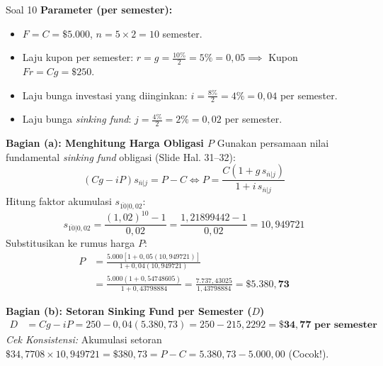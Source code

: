 \documentclass[11pt,a4paper]{article}
\begin{document}
\begin{solutionbox}{Soal 10}
\textbf{Parameter (per semester):}
\begin{itemize}[itemsep=1pt]
    \item $F = C = \$5.000$, $n = 5 \times 2 = 10$ semester.
    \item Laju kupon per semester: $r = g = \frac{10\%}{2} = 5\% = 0{,}05 \implies$ Kupon $Fr = Cg = \$250$.
    \item Laju bunga investasi yang diinginkan: $i = \frac{8\%}{2} = 4\% = 0{,}04$ per semester.
    \item Laju bunga \textit{sinking fund}: $j = \frac{4\%}{2} = 2\% = 0{,}02$ per semester.
\end{itemize}

\textbf{Bagian (a): Menghitung Harga Obligasi $P$}
Gunakan persamaan nilai fundamental \textit{sinking fund} obligasi (Slide Hal. 31--32):
\begin{equation*}
    (Cg - iP) s_{\overline{n}|j} = P - C \iff P = \frac{C(1 + g \, s_{\overline{n}|j})}{1 + i \, s_{\overline{n}|j}}
\end{equation*}
Hitung faktor akumulasi $s_{\overline{10}|0{,}02}$:
\begin{equation*}
    s_{\overline{10}|0{,}02} = \frac{(1{,}02)^{10} - 1}{0{,}02} = \frac{1{,}21899442 - 1}{0{,}02} = 10{,}949721
\end{equation*}
Substitusikan ke rumus harga $P$:
\begin{align*}
    P &= \frac{5.000 \left[ 1 + 0{,}05(10{,}949721) \right]}{1 + 0{,}04(10{,}949721)} \\[0.3em]
      &= \frac{5.000(1 + 0{,}54748605)}{1 + 0{,}43798884} = \frac{7.737{,}43025}{1{,}43798884} = \mathbf{\$5.380{,}73}
\end{align*}

\textbf{Bagian (b): Setoran Sinking Fund per Semester ($D$)}
\begin{align*}
    D &= Cg - iP = 250 - 0{,}04(5.380{,}73) = 250 - 215{,}2292 = \mathbf{\$34{,}77 \text{ per semester}}
\end{align*}
\textit{Cek Konsistensi:} Akumulasi setoran $\$34{,}7708 \times 10{,}949721 = \$380{,}73 = P - C = 5.380{,}73 - 5.000{,}00$ (Cocok!).
\end{solutionbox}

\vspace{1.2em}
\end{document}
